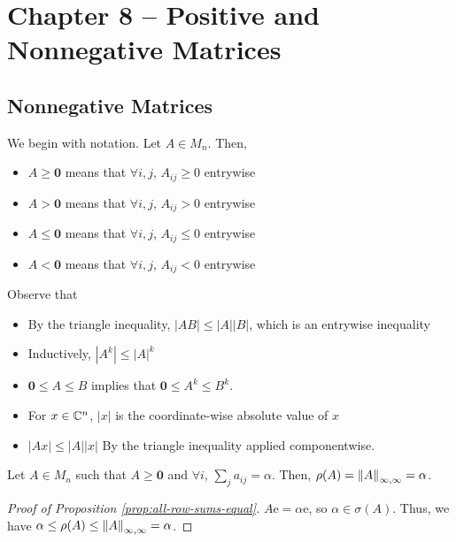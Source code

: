 \section{Chapter 8 -- Positive and Nonnegative Matrices}

\subsection{Nonnegative Matrices}
We begin with notation. Let $A \in M_n$. Then,
\begin{itemize}
    \item $A \ge \mathbf{0}$ means that $\forall i,j$, $A_{ij} \ge 0$ entrywise
    \item $A > \mathbf{0}$ means that $\forall i,j$, $A_{ij} > 0$ entrywise
    \item $A \le \mathbf{0}$ means that $\forall i,j$, $A_{ij} \le 0$ entrywise
    \item $A < \mathbf{0}$ means that $\forall i,j$, $A_{ij} < 0$ entrywise
\end{itemize}
Observe that
\begin{itemize}
    \item By the triangle inequality, $|AB| \le |A||B|$, which is an entrywise inequality
    \item Inductively, $|A^k| \le |A|^k$
    \item $\mathbf{0} \le A \le B$ implies that $\mathbf{0} \le A^k \le B^k$.
    \item For $x \in \mathbb C^n$, $|x|$ is the coordinate-wise absolute value of $x$
    \item $|Ax| \le |A||x|$ By the triangle inequality applied componentwise.
\end{itemize}

\begin{proposition}
\label{prop:all-row-sums-equal}
Let $A \in M_n$ such that $A \ge \mathbf{0}$ and $\forall i$, $\sum_j a_{ij} = \alpha$. Then, $\rho(A) = \left\lVert A\right\rVert_{\infty,\infty} = \alpha$.
\end{proposition}

\begin{proof}[Proof of Proposition \ref{prop:all-row-sums-equal}]
$A\mathrm{e} = \alpha\mathrm{e}$, so $\alpha \in \sigma(A)$. Thus, we have $\alpha \le \rho(A) \le \left\lVert A\right\rVert_{\infty,\infty} = \alpha$.
\end{proof}

